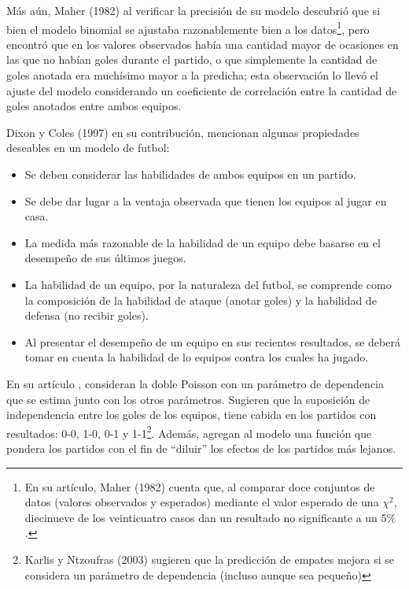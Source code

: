 Más aún, Maher (1982) \cite{maher1982modelling} al verificar la precisión de su modelo descubrió que si bien el modelo binomial se ajustaba razonablemente bien a los datos\footnote{En su artículo, Maher (1982) \cite{maher1982modelling} cuenta que, al comparar doce conjuntos de datos (valores observados y esperados) mediante el valor esperado de una $\chi^2$, diecinueve de los veinticuatro casos dan un resultado no significante a un $5\%$.}, pero encontró que en los valores observados había una cantidad mayor de ocasiones en las que no habían goles durante el partido, o que simplemente la cantidad de goles anotada era muchísimo mayor a la predicha; esta observación lo llevó el ajuste del modelo considerando un coeficiente de correlación entre la cantidad de goles anotados entre ambos equipos.

Dixon y Coles (1997) \cite{dixon1997modelling} en su contribución, mencionan algunas propiedades deseables en un modelo de futbol:
\begin{itemize}
	\item Se deben considerar las habilidades de ambos equipos en un partido.
	\item Se debe dar lugar a la ventaja observada que tienen los equipos al jugar en casa.
	\item La medida más razonable de la habilidad de un equipo debe basarse en el desempeño de sus últimos juegos.
	\item La habilidad de un equipo, por la naturaleza del futbol, se comprende como la composición de la habilidad de ataque (anotar goles) y la habilidad de defensa (no recibir goles).
	\item Al presentar el desempeño de un equipo en sus recientes resultados, se deberá tomar en cuenta la habilidad de lo equipos contra los cuales ha jugado.
\end{itemize}

En su artículo \cite{dixon1997modelling}, consideran la doble Poisson con un parámetro de dependencia que se estima junto con los otros parámetros. Sugieren que la suposición de independencia entre los goles de los equipos, tiene cabida en los partidos con resultados: 0-0, 1-0, 0-1 y 1-1\footnote{Karlis y Ntzoufras (2003) \cite{karlis2003analysis} sugieren que la predicción de empates mejora si se considera un parámetro de dependencia (incluso aunque sea pequeño)}. Además, agregan al modelo una función que pondera los partidos con el fin de ``diluir'' los efectos de los partidos más lejanos. 

